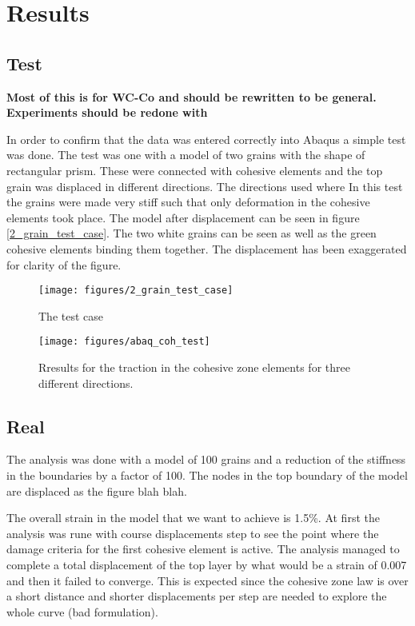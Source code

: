 \documentclass[convergence.tex]{subfiles}
\begin{document}
\chapter{Results}



\section{Test}

\textbf{Most of this is for WC-Co and should be rewritten to be general. Experiments should be redone with }

In order to confirm that the data was entered correctly into Abaqus a simple test was done. The test was one with a model of two grains with the shape of rectangular prism. These were connected with cohesive elements and the top grain was displaced in different directions. The directions used where  In this test the grains were made very stiff such that only deformation in the cohesive elements took place. The model after displacement can be seen in figure \ref{2_grain_test_case}. The two white grains can be seen as well as the green cohesive elements binding them together. The displacement has been exaggerated for clarity of the figure.

\begin{figure}[ht]
\centering
\texttt{[image: figures/2\_grain\_test\_case]}
\caption{The test case}
\label{fig:test_case}
\end{figure}


\begin{figure}[ht]
\centering
\texttt{[image: figures/abaq\_coh\_test]}
\caption{Rresults for the traction in the cohesive zone elements for three different directions.}
\label{fig:test_case}
\end{figure}

\section{Real}
The analysis was done with a model of 100 grains and a reduction of the stiffness in the boundaries by a factor of 100. The nodes in the top boundary of the model are displaced as the figure blah blah.

The overall strain in the model that we want to achieve is 1.5\%. At first the analysis was rune with course displacements step to see the point where the damage criteria for the first cohesive element is active. The analysis managed to complete a total displacement of the top layer by what would be a strain of 0.007 and then it failed to converge. This is expected since the cohesive zone law is over a short distance and shorter displacements per step are needed to explore the whole curve (bad formulation).
\end{document}

